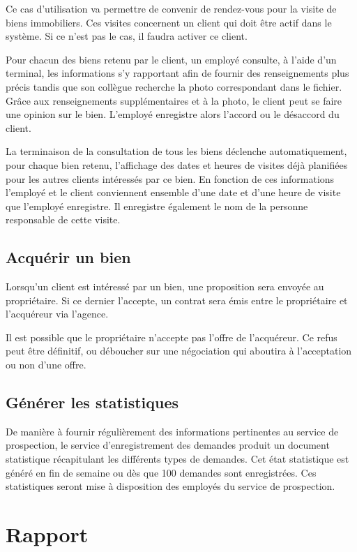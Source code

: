 Ce cas d'utilisation va permettre de convenir de rendez-vous pour la visite de biens immobiliers. Ces visites concernent un client qui doit être actif dans le système. Si ce n'est pas le cas, il faudra activer ce client.

Pour chacun des biens retenu par le client, un employé consulte, à l'aide d'un terminal, les informations s'y rapportant afin de fournir des renseignements plus précis tandis que son collègue recherche la photo correspondant dans le fichier. Grâce aux renseignements supplémentaires et à la photo, le client peut se faire une opinion sur le bien. L'employé enregistre alors l'accord ou le désaccord du client.

La terminaison de la consultation de tous les biens déclenche automatiquement, pour chaque bien retenu, l'affichage des dates et heures de visites déjà planifiées pour les autres clients intéressés par ce bien. En fonction de ces informations l'employé et le client conviennent ensemble d'une date et d'une heure de visite que l'employé enregistre. Il enregistre également le nom de la personne responsable de cette visite.

\subsection{Acquérir un bien}

Lorsqu'un client est intéressé par un bien, une proposition sera envoyée au propriétaire. Si ce dernier l'accepte, un contrat sera émis entre le propriétaire et l'acquéreur via l'agence.

Il est possible que le propriétaire n'accepte pas l'offre de l'acquéreur. Ce refus peut être définitif, ou déboucher sur une négociation qui aboutira à l'acceptation ou non d'une offre.

\subsection{Générer les statistiques}

De manière à fournir régulièrement des informations pertinentes au service de prospection, le service d'enregistrement des demandes produit un document statistique récapitulant les différents types de demandes. Cet état statistique est généré en fin de semaine ou dès que 100 demandes sont enregistrées. Ces statistiques seront mise à disposition des employés du service de prospection.

\section{Rapport}

